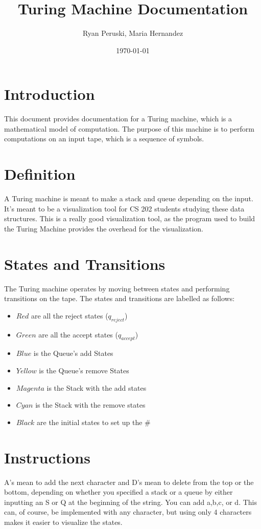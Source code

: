 \documentclass{article}
\title{Turing Machine Documentation}
\author{Ryan Peruski, Maria Hernandez}
\date{\today}
\begin{document}
\maketitle

\section{Introduction}
This document provides documentation for a Turing machine, which is a mathematical model of computation. The purpose of this machine is to perform computations on an input tape, which is a sequence of symbols.

\section{Definition}
A Turing machine is meant to make a stack and queue depending on the input. It's meant to be a visualization tool for CS 202 students
studying these data structures. This is a really good visualization tool, as the program used to build the Turing Machine provides the overhead for
the visualization.

\section{States and Transitions}
The Turing machine operates by moving between states and performing transitions on the tape. The states and transitions are labelled as follows:

\begin{itemize}
    \item $Red$ are all the reject states ($q_{reject}$)
    \item $Green$ are all the accept states ($q_{accept}$)
    \item $Blue$ is the Queue's add States
    \item $Yellow$ is the Queue's remove States
    \item $Magenta$ is the Stack with the add states
    \item $Cyan$ is the Stack with the remove states
    \item $Black$ are the initial states to set up the $\#$
\end{itemize}

\section{Instructions}
A's mean to add the next character and D's mean to delete from the top or the bottom, depending on whether you specified a stack or a queue
by either inputting an S or Q at the beginning of the string. 
You can add a,b,c, or d. This can, of course, be implemented with any character,
but using only 4 characters makes it easier to visualize the states.
\end{document}
